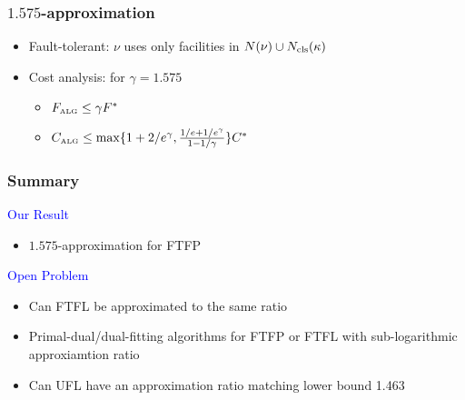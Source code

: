 \documentclass[handout, hyperref, dvipsnames]{beamer}
\begin{document}
\begin{frame}
  \frametitle{$1.575$-approximation}

  \begin{itemize}
  \item Fault-tolerant: $\nu$ uses only facilities in
    $N(\nu) \cup N_{{\mbox{\scriptsize\rm cls}}}(\kappa)$
  \item Cost analysis: for $\gamma = 1.575$
    \begin{itemize}
    \item $F_{\mbox{\tiny\rm ALG}} \leq \gamma F^\ast$
    \item $C_{\mbox{\tiny\rm ALG}} \leq \max\{1+2/e^\gamma, \frac{1/e+1/e^\gamma}{1-1/\gamma}\} C^\ast$
    \end{itemize}
  \end{itemize}
\end{frame}

\begin{frame}
  \frametitle{Summary}
  
  {\Large \textcolor{blue}{
  Our Result}}
  \begin{itemize}\addtolength{\itemsep}{1\baselineskip}
  \item $1.575$-approximation for FTFP
  \end{itemize}

  \vspace{.3in}
  {\Large \textcolor{blue}{
  Open Problem}}
  \begin{itemize}
  \item Can FTFL be approximated to the same ratio
  \item Primal-dual/dual-fitting algorithms for FTFP or FTFL with sub-logarithmic approxiamtion ratio
  \item Can UFL have an approximation ratio matching lower bound 1.463
  \end{itemize}
\end{frame}

\end{document}
